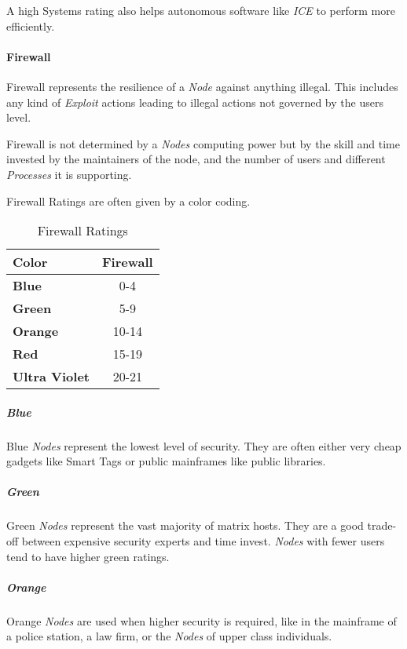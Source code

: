 A high Systems rating also helps autonomous software like \emph{ICE} to
perform more efficiently.

\paragraph{Firewall}

Firewall represents the resilience of a \emph{Node} against anything
illegal. This includes any kind of \emph{Exploit} actions leading to
illegal actions not governed by the users level.

Firewall is not determined by a \emph{Nodes} computing power but by
the skill and time invested by the maintainers of the node, and the
number of users and different \emph{Processes} it is supporting.

\hfill

Firewall Ratings are often given by a color coding.

\begin{table}[htb]
    \caption[Firewall Ratings]{Firewall Ratings}
    \label{tab:firwall ratings}
    \centering
    \begin{tabular}{lc}
        \toprule
        \textbf{Color}        & \textbf{Firewall} \\
        \midrule
        \textbf{Blue}         & 0-4               \\
        \textbf{Green}        & 5-9               \\
        \textbf{Orange}       & 10-14             \\
        \textbf{Red}          & 15-19             \\
        \textbf{Ultra Violet} & 20-21             \\
        \bottomrule
    \end{tabular}
\end{table}

\subparagraph{Blue} Blue \emph{Nodes} represent the lowest level of security.
They are often either very cheap gadgets like Smart Tags or public mainframes
like public libraries.

\subparagraph{Green} Green \emph{Nodes} represent the vast majority of matrix hosts.
They are a good trade-off between expensive security experts and time invest.
\emph{Nodes} with fewer users tend to have higher green ratings.

\subparagraph{Orange} Orange \emph{Nodes} are used when higher security is required,
like in the mainframe of a police station, a law firm, or the \emph{Nodes} of upper
class individuals.

